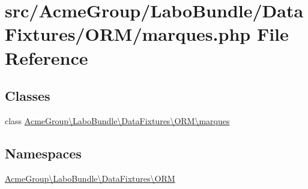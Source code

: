 \hypertarget{marques_8php}{\section{src/\+Acme\+Group/\+Labo\+Bundle/\+Data\+Fixtures/\+O\+R\+M/marques.php File Reference}
\label{marques_8php}
}
\subsection*{Classes}
\begin{DoxyCompactItemize}
\item 
class \hyperlink{class_acme_group_1_1_labo_bundle_1_1_data_fixtures_1_1_o_r_m_1_1marques}{Acme\+Group\textbackslash{}\+Labo\+Bundle\textbackslash{}\+Data\+Fixtures\textbackslash{}\+O\+R\+M\textbackslash{}marques}
\end{DoxyCompactItemize}
\subsection*{Namespaces}
\begin{DoxyCompactItemize}
\item 
 \hyperlink{namespace_acme_group_1_1_labo_bundle_1_1_data_fixtures_1_1_o_r_m}{Acme\+Group\textbackslash{}\+Labo\+Bundle\textbackslash{}\+Data\+Fixtures\textbackslash{}\+O\+R\+M}
\end{DoxyCompactItemize}
